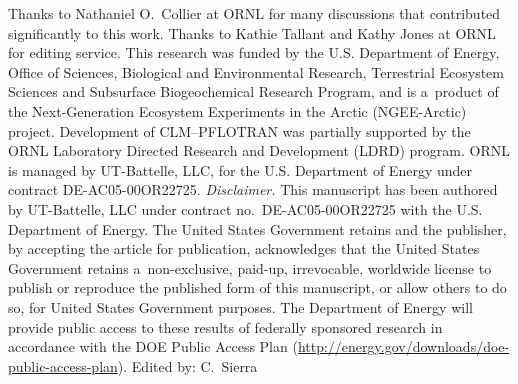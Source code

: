 \documentclass[gmd,noline]{copernicus}
\begin{document}
\begin{acknowledgements}
      Thanks to Nathaniel O.~Collier at ORNL for many discussions that
      contributed significantly to this work. Thanks to Kathie Tallant and
      Kathy Jones at ORNL for editing service. This research was funded by
      the U.S. Department of Energy, Office of Sciences, Biological and
      Environmental Research, Terrestrial Ecosystem Sciences and Subsurface
      Biogeochemical Research Program, and is a~product of the
      Next-Generation Ecosystem Experiments in the Arctic (NGEE-Arctic)
      project. Development of CLM--PFLOTRAN was partially supported by the
      ORNL Laboratory Directed Research and Development (LDRD) program. ORNL
      is managed by UT-Battelle, LLC, for the U.S. Department of Energy
      under contract DE-AC05-00OR22725.  \hack{\newline}
\hack{\newline}    \hack{\noindent}\textit{Disclaimer.}
 This manuscript has been authored by UT-Battelle, LLC under contract
      no.~DE-AC05-00OR22725 with the U.S. Department of Energy.  The United
      States Government retains and the publisher, by accepting the article
      for publication, acknowledges that the United States Government
      retains a~non-exclusive, paid-up, irrevocable, worldwide license to
      publish or reproduce the published form of this manuscript, or allow
      others to do so, for United States Government purposes.  The
      Department of Energy will provide public access to these results of
      federally sponsored research in accordance with the DOE Public Access
      Plan
      (\url{http://energy.gov/downloads/doe-public-access-plan}).\hack{\newline}\hack{\newline}
      Edited by: C.~Sierra
\end{acknowledgements}
\end{document}
